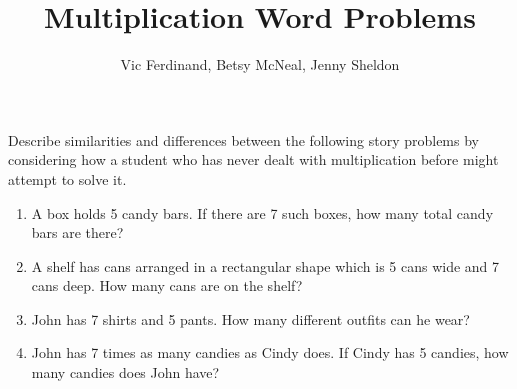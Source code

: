 \documentclass[nooutcomes,noauthor,handout]{ximera}
\title{Multiplication Word Problems}
\author{Vic Ferdinand, Betsy McNeal, Jenny Sheldon}
\begin{document}
\begin{abstract} \end{abstract}
\maketitle


\begin{problem}
Describe similarities and differences between the following story problems by considering how a student who has never dealt with multiplication before might attempt to solve it.
\begin{enumerate}
\item A box holds 5 candy bars.  If there are 7 such boxes, how many total candy bars are there?

\vfill

\item A shelf has cans arranged in a rectangular shape which is 5 cans wide and 7 cans deep. How many cans are on the shelf?


\vfill


\item John has 7 shirts and 5 pants.  How many different outfits can he wear?


\vfill

\item John has 7 times as many candies as Cindy does.  If Cindy has 5 candies, how many candies does John have?

\vfill

\end{enumerate}
\end{problem}
\end{document}
